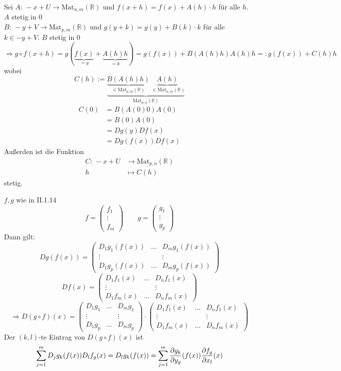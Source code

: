  Sei $A:\, -x+U \to \text{Mat}_{n,m}(\mathbb{R})$ und $f(x+h)=f(x)+A(h)\cdot h $ für alle $h$. $A$ stetig in $0$ \\
$B:\, -y+V \to \text{Mat}_{p,m}(\mathbb{R})$ und $g(y+k)=g(y)+B(k)\cdot k$ für alle $k \in -y+V$. $B$ stetig in $0$
\[
	\Rightarrow g \circ f(x+h)= g( \underset{=y}{\underbrace{f(x)}}+ \underset{=k}{\underbrace{A(h)h}}) = g(f(x))+B(A(h)h)A(h)h =: g(f(x))+C(h)h
\]
wobei 
\[
	C(h):= \underset{\text{Mat}_{p,n}(\mathbb{R})}{\underbrace{ \underset{\in \text{Mat}_{p,m}(\mathbb{R})}{\underbrace{B(A(h)h)}} \underset{ \, \, \in
	 \text{Mat}_{n,m}(\mathbb{R})}{\underbrace{A(h)}} }}
\]
\begin{align*}
	C(0)&=B(A(0)0)A(0)\\
	&= B(0)A(0) \\
	&= Dg(y)Df(x) \\
	&= Dg(f(x))Df(x)
\end{align*}
Außerden ist die Funktion 
\begin{align*}
	C: \,-x+U &\to \text{Mat}_{p,n}(\mathbb{R}) \\
	h &\mapsto C(h)
\end{align*}	
stetig. \bewende

$f,g$ wie in II.1.14 
\[
	f= \begin{pmatrix}
		f_1 \\
		\vdots \\
		f_m
	\end{pmatrix} \qquad g= \begin{pmatrix}
		g_1 \\
		\vdots \\
		g_p
	\end{pmatrix}
\]
Dann gilt:
\[
	Dg(f(x))= \begin{pmatrix}
		D_1g_1(f(x)) & \dots & D_mg_1(f(x)) \\
		\vdots & & \vdots \\
		D_1g_p(f(x)) & \dots & D_mg_p(f(x))
	\end{pmatrix}
\]
\[
	Df(x)= \begin{pmatrix}
		D_1f_1(x) & \dots & D_nf_1(x) \\
		\vdots & & \vdots \\
		D_1f_m(x) & \dots & D_nf_m(x)
	\end{pmatrix}
\]
\[
	\Rightarrow D(g \circ f)(x)= 
	\begin{pmatrix}
			D_1g_1 & \dots & D_mg_1 \\
			\vdots & & \vdots \\
			D_1g_p & \dots & D_mg_p
		\end{pmatrix} \cdot \begin{pmatrix}
		D_1f_1(x) & \dots & D_nf_1(x) \\
		\vdots & & \vdots \\
		D_1f_m(x) & \dots & D_nf_m(x)
	\end{pmatrix}
\]
Der $(k,l)$-te Eintrag von $D(g \circ f)(x)$ ist 
\[
	\sum^{m}_{j=1}D_jg_k(f(x))D_lf_g(x)=D_lg_k(f(x)) = \sum^{m}_{j=1}\frac{{\partial g_k}}{{\partial y_g}} (f(x))\frac{{\partial f_g}}{{\partial x_l}} (x)
\]


